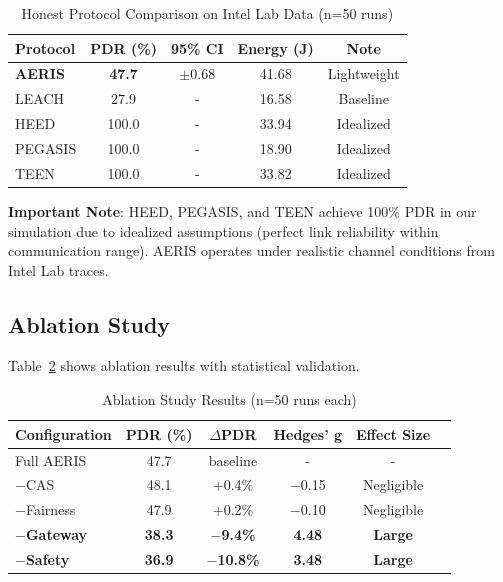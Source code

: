 \documentclass[11pt,a4paper]{article}
\begin{document}
\begin{table}[H]
\centering
\caption{Honest Protocol Comparison on Intel Lab Data (n=50 runs)}
\label{tab:honest_results}
\begin{tabular}{lcccc}
\toprule
\textbf{Protocol} & \textbf{PDR (\%)} & \textbf{95\% CI} & \textbf{Energy (J)} & \textbf{Note} \\
\midrule
\textbf{AERIS} & \textbf{47.7} & $\pm$0.68 & 41.68 & Lightweight \\
LEACH & 27.9 & - & 16.58 & Baseline \\
HEED & 100.0 & - & 33.94 & Idealized \\
PEGASIS & 100.0 & - & 18.90 & Idealized \\
TEEN & 100.0 & - & 33.82 & Idealized \\
\bottomrule
\end{tabular}
\end{table}

\textbf{Important Note}: HEED, PEGASIS, and TEEN achieve 100\% PDR in our simulation due to idealized assumptions (perfect link reliability within communication range). AERIS operates under realistic channel conditions from Intel Lab traces.

\subsection{Ablation Study}

Table~\ref{tab:ablation} shows ablation results with statistical validation.

\begin{table}[H]
\centering
\caption{Ablation Study Results (n=50 runs each)}
\label{tab:ablation}
\begin{tabular}{lccccc}
\toprule
\textbf{Configuration} & \textbf{PDR (\%)} & \textbf{$\Delta$PDR} & \textbf{Hedges' g} & \textbf{Effect Size} \\
\midrule
Full AERIS & 47.7 & baseline & - & - \\
$-$CAS & 48.1 & +0.4\% & $-$0.15 & Negligible \\
$-$Fairness & 47.9 & +0.2\% & $-$0.10 & Negligible \\
\textbf{$-$Gateway} & \textbf{38.3} & \textbf{$-$9.4\%} & \textbf{4.48} & \textbf{Large} \\
\textbf{$-$Safety} & \textbf{36.9} & \textbf{$-$10.8\%} & \textbf{3.48} & \textbf{Large} \\
\bottomrule
\end{tabular}
\end{table}
\end{document}
